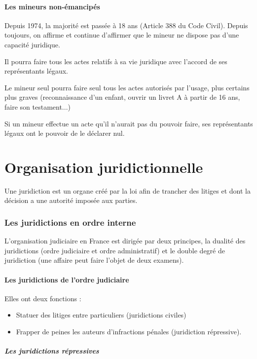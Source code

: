 \documentclass[10pt,a4paper]{article}
\begin{document}
\subsection{Les mineurs non-émancipés}

Depuis 1974, la majorité est passée à 18 ans (Article 388 du Code Civil). Depuis toujours, on affirme et continue d'affirmer que le mineur ne dispose pas d'une capacité juridique.

Il pourra faire tous les actes relatifs à sa vie juridique avec l'accord de ses représentants légaux.

Le mineur seul pourra faire seul tous les actes autorisés par l'usage, plus certains plus graves (reconnaissance d'un enfant, ouvrir un livret A à partir de 16 ans, faire son testament...)

Si un mineur effectue un acte qu'il n'aurait pas du pouvoir faire, ses représentants légaux ont le pouvoir de le déclarer nul.

\part{Organisation juridictionnelle}

Une juridiction est un organe créé par la loi afin de trancher des litiges et dont la décision a une autorité imposée aux parties.

\section{Les juridictions en ordre interne}

L'organisation judiciaire en France est dirigée par deux principes, la dualité des juridictions (ordre judiciaire et ordre administratif) et le double degré de juridiction (une affaire peut faire l'objet de deux examens).

\subsection{Les juridictions de l'ordre judiciaire}

Elles ont deux fonctions :
\begin{itemize}
\item Statuer des litiges entre particuliers (juridictions civiles)
\item Frapper de peines les auteurs d'infractions pénales (juridiction répressive).
\end{itemize}

\subsubsection{Les juridictions répressives}
\end{document}
